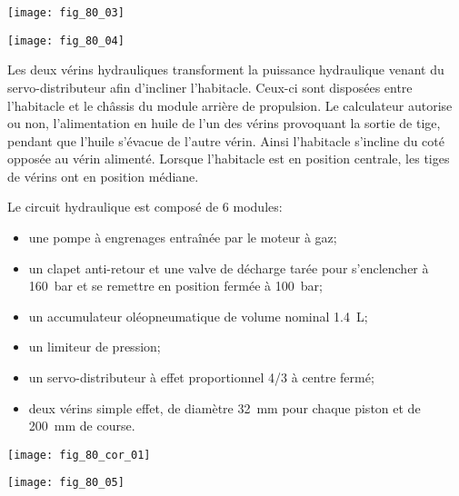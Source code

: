 \begin{center}
\texttt{[image: fig\_80\_03]}
\end{center}

\begin{center}
\texttt{[image: fig\_80\_04]}
\end{center}


Les deux vérins hydrauliques transforment la puissance hydraulique venant du servo-distributeur afin d’incliner l’habitacle. Ceux-ci sont disposées entre l’habitacle et le châssis du module arrière de propulsion. Le calculateur autorise ou non, l’alimentation en huile de l’un des vérins provoquant la sortie de tige, pendant que l’huile s'évacue de l’autre vérin. Ainsi l’habitacle s'incline du coté opposée au vérin alimenté. Lorsque l’habitacle est en position centrale, les tiges de vérins ont en position médiane.


Le circuit hydraulique est composé de 6 modules:
\begin{itemize}
\item une pompe à engrenages entraînée par le moteur à gaz;
\item un clapet anti-retour et une valve de décharge tarée pour s’enclencher à \SI{160}{bar} et se remettre en position fermée à \SI{100}{bar};
\item un accumulateur oléopneumatique de volume nominal \SI{1,4}{L};
\item un limiteur de pression;
\item un servo-distributeur à effet proportionnel 4/3 à centre fermé;
\item deux vérins simple effet, de diamètre \SI{32}{mm} pour chaque piston et de \SI{200}{mm} de course.
\end{itemize}

\fi


\ifprof
\begin{corrige}
\begin{center}
\texttt{[image: fig\_80\_cor\_01]}
\end{center}
\end{corrige}
\else\begin{marginfigure}
\texttt{[image: fig\_80\_05]}
\end{marginfigure}

